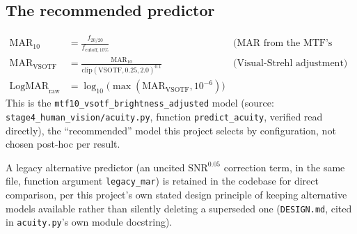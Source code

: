 \subsection{The recommended predictor}
\begin{align}
\mathrm{MAR}_{10} &= \frac{f_{20/20}}{f_{\mathrm{cutoff,10\%}}}
& \text{(MAR from the MTF's 10\% cutoff spatial frequency)} \\
\mathrm{MAR}_{\mathrm{VSOTF}} &= \frac{\mathrm{MAR}_{10}}{\mathrm{clip}(\mathrm{VSOTF},0.25,2.0)^{0.1}}
& \text{(Visual-Strehl adjustment)} \\
\mathrm{LogMAR}_{\mathrm{raw}} &= \log_{10}\!\big(\max(\mathrm{MAR}_{\mathrm{VSOTF}},10^{-6})\big)
\end{align}
This is the \texttt{mtf10\_vsotf\_brightness\_adjusted} model (source:
\texttt{stage4\_human\_vision/acuity.py}, function \texttt{predict\_acuity}, verified
read directly), the ``recommended'' model this project selects by configuration, not
chosen post-hoc per result.

A legacy alternative predictor (an uncited $\mathrm{SNR}^{0.05}$ correction term, in the
same file, function argument \texttt{legacy\_mar}) is retained in the codebase for
direct comparison, per this project's own stated design principle of keeping
alternative models available rather than silently deleting a superseded one
(\texttt{DESIGN.md}, cited in \texttt{acuity.py}'s own module docstring).

